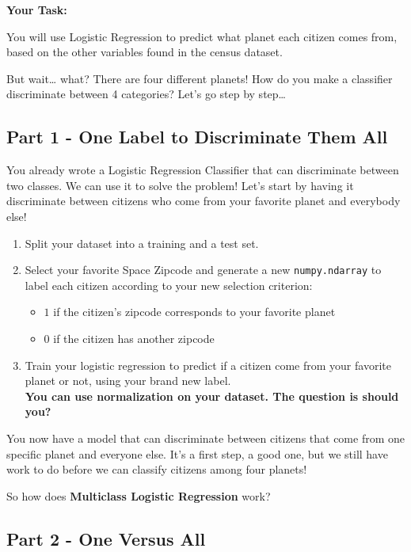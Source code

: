 \documentclass[]{article}
\begin{document}
\textbf{Your Task:}

You will use Logistic Regression to predict what planet each citizen
comes from, based on the other variables found in the census dataset.

But wait\ldots{} what? There are four different planets! How do you make
a classifier discriminate between 4 categories? Let's go step by
step\ldots{}

\hypertarget{part-1---one-label-to-discriminate-them-all}{%
\subsection{Part 1 - One Label to Discriminate Them
All}\label{part-1---one-label-to-discriminate-them-all}}

You already wrote a Logistic Regression Classifier that can discriminate
between two classes. We can use it to solve the problem! Let's start by
having it discriminate between citizens who come from your favorite
planet and everybody else!

\begin{enumerate}
\def\labelenumi{\arabic{enumi})}
\item
  Split your dataset into a training and a test set.
\item
  Select your favorite Space Zipcode and generate a new
  \texttt{numpy.ndarray} to label each citizen according to your new
  selection criterion:

  \begin{itemize}
  \item
    \(1\) if the citizen's zipcode corresponds to your favorite planet
  \item
    \(0\) if the citizen has another zipcode
  \end{itemize}
\item
  Train your logistic regression to predict if a citizen come from your
  favorite planet or not, using your brand new label.\\
  \textbf{You can use normalization on your dataset. The question is
  should you?}
\end{enumerate}

You now have a model that can discriminate between citizens that come
from one specific planet and everyone else. It's a first step, a good
one, but we still have work to do before we can classify citizens among
four planets!

So how does \textbf{Multiclass Logistic Regression} work?

\hypertarget{part-2---one-versus-all}{%
\subsection{Part 2 - One Versus All}\label{part-2---one-versus-all}}
\end{document}

